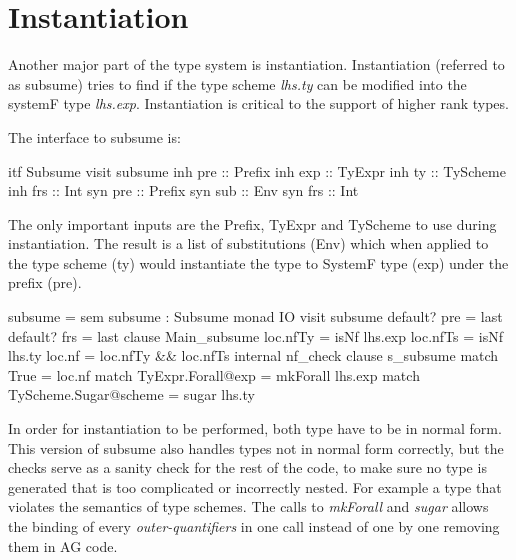 \section{Instantiation}
Another major part of the type system is instantiation. Instantiation (referred to as subsume) tries to find if the type scheme \emph{lhs.ty} can be modified into the systemF type \emph{lhs.exp}. Instantiation is critical to the support of higher rank types.

The interface to subsume is:
\begin{code}
itf Subsume
  visit subsume
    inh pre  :: Prefix
    inh exp  :: TyExpr
    inh ty   :: TyScheme
    inh frs  :: Int
    syn pre  :: Prefix
    syn sub  :: Env
    syn frs  :: Int
\end{code}
The only important inputs are the Prefix, TyExpr and TyScheme to use during instantiation. The result is a list of substitutions (Env) which when applied to the type scheme (ty) would instantiate the type to SystemF type (exp) under the  prefix (pre).


\begin{code}
subsume = sem subsume : Subsume monad IO 
             visit subsume
               default? pre = last
               default? frs = last
               clause Main_subsume
                loc.nfTy = isNf lhs.exp
                loc.nfTs = isNf lhs.ty
                loc.nf   = loc.nfTy && loc.nfTs
                internal nf_check
                    clause s_subsume
                      match True                  = loc.nf
                      match TyExpr.Forall@exp     = mkForall lhs.exp
                      match TyScheme.Sugar@scheme = sugar lhs.ty
\end{code}
In order for instantiation to be performed, both type have to be in normal form. This version of subsume also handles types not in normal form correctly, but the checks serve as a sanity check for the rest of the code, to make sure no type is  generated that is too complicated or incorrectly nested. For example a type that violates the semantics of type schemes.
The calls to \emph{mkForall} and \emph{sugar} allows the binding of every \emph{outer-quantifiers} in one call instead of one by one removing them in AG code.

